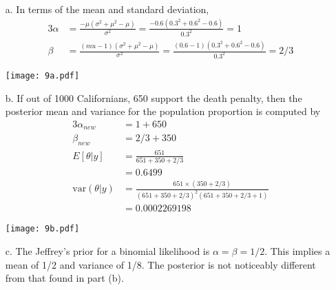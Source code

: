 \documentclass[10pt]{article}
\begin{document}
\begin{enumerate}
\item[a.] In terms of the mean and standard deviation,
\begin{alignat*}{3}
\alpha &= \frac{-\mu(\sigma^2+\mu^2-\mu)}{\sigma^2}=\frac{-0.6(0.3^2+0.6^2-0.6)}{0.3^2}=1 \\
\beta &= \frac{(mu-1)(\sigma^2+\mu^2-\mu)}{\sigma^2}=\frac{(0.6-1)(0.3^2+0.6^2-0.6)}{0.3^2}=2/3
\end{alignat*}
\begin{center}
\texttt{[image: 9a.pdf]}
\end{center}
\item[b.] If out of 1000 Californians, 650 support the death penalty, then the posterior mean and variance for the population proportion is computed by
\begin{alignat*}{3}
\alpha_{new}&=1 + 650 \\
\beta_{new}&=2/3 + 350 \\
E[\theta | y] &= \frac{651}{651+350+2/3} \\
&=0.6499 \\
\text{var}(\theta | y) &= \frac{651 \times (350+2/3)}{(651+350+2/3)^2(651+350+2/3+1)} \\
&=0.0002269198
\end{alignat*}
\begin{center}
\texttt{[image: 9b.pdf]}
\end{center}
\item[c.] The Jeffrey's prior for a binomial likelihood is $\alpha=\beta=1/2$. This implies a mean of 1/2 and variance of 1/8. The posterior is not noticeably different from that found in part (b).
\end{enumerate}
\end{document}
